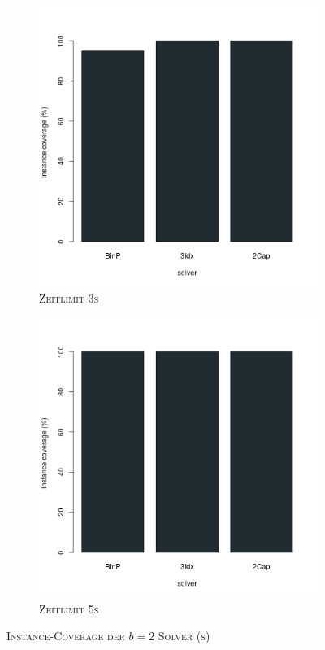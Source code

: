 \begin{figure}[H]
\begin{subfigure}[b]{0.3\textwidth}
\includegraphics[width=1.2\textwidth]{img/solver_instance_coverage_b=2_s_3s.png}
\caption{\textsc{Zeitlimit 3s}}
\label{fig:instance_cov_b=2_s_b}
\end{subfigure}
\hfill
\begin{subfigure}[b]{0.3\textwidth}
\centering
\includegraphics[width=1.2\textwidth]{img/solver_instance_coverage_b=2_s_5s.png}
\caption{\textsc{Zeitlimit 5s}}
\label{fig:instance_cov_b=2_s_c}
\end{subfigure}

\caption{\textsc{Instance-Coverage der $b=2$ Solver (s)}}
\label{fig:instance_cov_b=2_s}
\end{figure}

